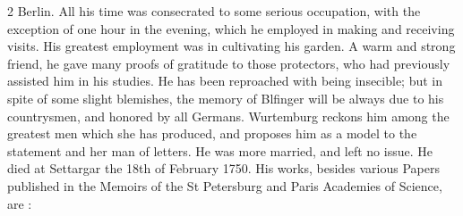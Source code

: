 \documentclass[10pt]{article}
\begin{document}
\begin{multicols}{2}
Berlin. All his time was consecrated to some serious occupation, with the exception of one hour in the evening, which he employed in making and receiving visits. His greatest employment was in cultivating his garden. A warm and strong friend, he gave many proofs of gratitude to those protectors, who had previously assisted him in his studies. He has been reproached with being insecible; but in spite of some slight blemishes, the memory of Blfinger will be always due to his countrysmen, and honored by all Germans. Wurtemburg reckons him among the greatest men which she has produced, and proposes him as a model to the statement and her man of letters. He was more married, and left no issue. He died at Settargar the 18th of February 1750. His works, besides various Papers published in the Memoirs of the St Petersburg and Paris Academies of Science, are :


\end{multicols}
\end{document}
